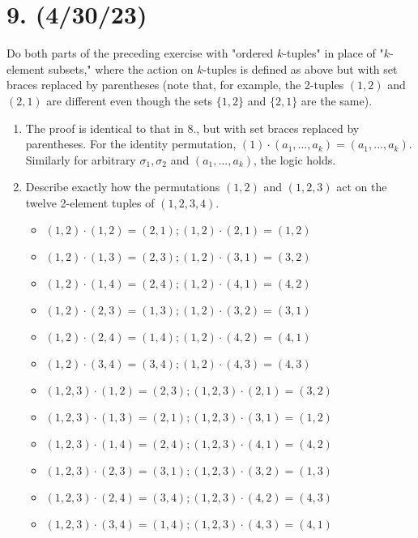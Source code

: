 \documentclass{article}
\begin{document}
\section*{9. (4/30/23)}

Do both parts of the preceding exercise with "ordered $k$-tuples" in place of "$k$-element subsets," where the action on $k$-tuples is defined as above but with set braces replaced by parentheses (note that, for example, the 2-tuples $(1, 2)$ and $(2, 1)$ are different even though the sets $\{1, 2\}$ and $\{2, 1\}$ are the same).

\begin{enumerate}[label=(\alph*)]
    \item The proof is identical to that in 8., but with set braces replaced by parentheses. For the identity permutation, $(1) \cdot ( a_1, ..., a_k ) = ( a_1, ..., a_k )$. Similarly for arbitrary $\sigma_1, \sigma_2$ and $( a_1, ..., a_k )$, the logic holds.
    \item Describe exactly how the permutations $(1, 2)$ and $(1, 2, 3)$ act on the twelve 2-element tuples of $(1, 2, 3, 4)$.
          \begin{itemize}
            \item $(1, 2) \cdot (1, 2) = (2, 1); (1, 2) \cdot (2, 1) = (1, 2)$
            \item $(1, 2) \cdot (1, 3) = (2, 3); (1, 2) \cdot (3, 1) = (3, 2)$
            \item $(1, 2) \cdot (1, 4) = (2, 4); (1, 2) \cdot (4, 1) = (4, 2)$
            \item $(1, 2) \cdot (2, 3) = (1, 3); (1, 2) \cdot (3, 2) = (3, 1)$
            \item $(1, 2) \cdot (2, 4) = (1, 4); (1, 2) \cdot (4, 2) = (4, 1)$
            \item $(1, 2) \cdot (3, 4) = (3, 4); (1, 2) \cdot (4, 3) = (4, 3)$
            \item $(1, 2, 3) \cdot (1, 2) = (2, 3); (1, 2, 3) \cdot (2, 1) = (3, 2)$
            \item $(1, 2, 3) \cdot (1, 3) = (2, 1); (1, 2, 3) \cdot (3, 1) = (1, 2)$
            \item $(1, 2, 3) \cdot (1, 4) = (2, 4); (1, 2, 3) \cdot (4, 1) = (4, 2)$
            \item $(1, 2, 3) \cdot (2, 3) = (3, 1); (1, 2, 3) \cdot (3, 2) = (1, 3)$
            \item $(1, 2, 3) \cdot (2, 4) = (3, 4); (1, 2, 3) \cdot (4, 2) = (4, 3)$
            \item $(1, 2, 3) \cdot (3, 4) = (1, 4); (1, 2, 3) \cdot (4, 3) = (4, 1)$
          \end{itemize}
\end{enumerate}
\end{document}
